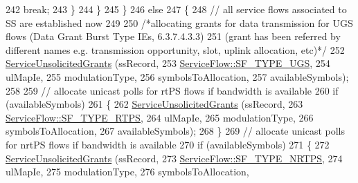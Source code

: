 \begin{DoxyCode}
242                       \textcolor{keywordflow}{break};
243                     \}
244                 \}
245             \}
246           \textcolor{keywordflow}{else}
247             \{
248               \textcolor{comment}{// all service flows associated to SS are established now}
249 
250               \textcolor{comment}{/*allocating grants for data transmission for UGS flows (Data Grant Burst Type IEs,
       6.3.7.4.3.3)}
251 \textcolor{comment}{               (grant has been referred by different names e.g. transmission opportunity, slot, uplink
       allocation, etc)*/}
252               \hyperlink{classns3_1_1UplinkSchedulerSimple_ab30024e72d773b5d0838b7d2222c8a1d}{ServiceUnsolicitedGrants} (ssRecord,
253                                         \hyperlink{classns3_1_1ServiceFlow_a7990ba10be1e098328fd1e6382a26235a969e0b62fa12fef1dbb23913744ed594}{ServiceFlow::SF\_TYPE\_UGS},
254                                         ulMapIe,
255                                         modulationType,
256                                         symbolsToAllocation,
257                                         availableSymbols);
258 
259               \textcolor{comment}{// allocate unicast polls for rtPS flows if bandwidth is available}
260               \textcolor{keywordflow}{if} (availableSymbols)
261                 \{
262                   \hyperlink{classns3_1_1UplinkSchedulerSimple_ab30024e72d773b5d0838b7d2222c8a1d}{ServiceUnsolicitedGrants} (ssRecord,
263                                             \hyperlink{classns3_1_1ServiceFlow_a7990ba10be1e098328fd1e6382a26235a0e98ff713b932a029acad7e5b24bbf55}{ServiceFlow::SF\_TYPE\_RTPS},
264                                             ulMapIe,
265                                             modulationType,
266                                             symbolsToAllocation,
267                                             availableSymbols);
268                 \}
269               \textcolor{comment}{// allocate unicast polls for nrtPS flows if bandwidth is available}
270               \textcolor{keywordflow}{if} (availableSymbols)
271                 \{
272                   \hyperlink{classns3_1_1UplinkSchedulerSimple_ab30024e72d773b5d0838b7d2222c8a1d}{ServiceUnsolicitedGrants} (ssRecord,
273                                             \hyperlink{classns3_1_1ServiceFlow_a7990ba10be1e098328fd1e6382a26235a7f8577f851a9f01d159442a3a3fcdf48}{ServiceFlow::SF\_TYPE\_NRTPS},
274                                             ulMapIe,
275                                             modulationType,
276                                             symbolsToAllocation,

\end{DoxyCode}

